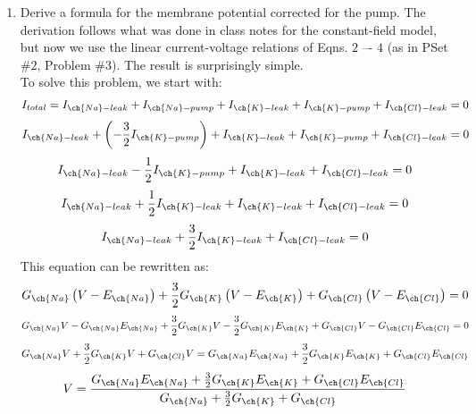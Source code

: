 \documentclass[11pt]{article}
\begin{document}
\begin{enumerate}[label=\arabic*.]
\begin{enumerate}[label=(\alph*)]
\newpage
\item
Derive a formula for the membrane potential corrected for the pump. The derivation follows what was done in class notes for the constant-field model, but now we use the linear current-voltage relations of Eqns. $2$ –- $4$ (as in PSet \#$2$, Problem \#$3$). The result is surprisingly simple.
\vspace*{1\baselineskip}
\\
To solve this problem, we start with:
\begin{align*}
I_{total} = I_{\ch{Na}-leak} + I_{\ch{Na}-pump} + I_{\ch{K}-leak} + I_{\ch{K}-pump} + I_{\ch{Cl}-leak} = 0
\end{align*}
\begin{align*}
I_{\ch{Na}-leak} + \left(-\frac{3} {2} I_{\ch{K}-pump}\right) + I_{\ch{K}-leak} + I_{\ch{K}-pump} + I_{\ch{Cl}-leak} = 0
\end{align*}
\begin{align*}
I_{\ch{Na}-leak} - \frac{1} {2} I_{\ch{K}-pump} + I_{\ch{K}-leak} + I_{\ch{Cl}-leak} = 0
\end{align*}
\begin{align*}
I_{\ch{Na}-leak} + \frac{1} {2} I_{\ch{K}-leak} + I_{\ch{K}-leak} + I_{\ch{Cl}-leak} = 0
\end{align*}
\begin{align*}
I_{\ch{Na}-leak} + \frac{3} {2} I_{\ch{K}-leak} + I_{\ch{Cl}-leak} = 0
\end{align*}
This equation can be rewritten as:
\begin{align*}
G_{\ch{Na}} \left(V - E_{\ch{Na}}\right) + \frac{3} {2} G_{\ch{K}} \left(V - E_{\ch{K}}\right) + G_{\ch{Cl}} \left(V - E_{\ch{Cl}}\right) = 0
\end{align*}
\begin{align*}
G_{\ch{Na}} V - G_{\ch{Na}} E_{\ch{Na}} + \frac{3} {2} G_{\ch{K}} V - \frac{3} {2} G_{\ch{K}} E_{\ch{K}} + G_{\ch{Cl}} V - G_{\ch{Cl}} E_{\ch{Cl}} = 0
\end{align*}
\begin{align*}
G_{\ch{Na}} V + \frac{3} {2} G_{\ch{K}} V + G_{\ch{Cl}} V = G_{\ch{Na}} E_{\ch{Na}} + \frac{3} {2} G_{\ch{K}} E_{\ch{K}} + G_{\ch{Cl}} E_{\ch{Cl}}
\end{align*}
\begin{align*}
V = \frac{G_{\ch{Na}} E_{\ch{Na}} + \frac{3} {2} G_{\ch{K}} E_{\ch{K}} + G_{\ch{Cl}} E_{\ch{Cl}}} {G_{\ch{Na}} + \frac{3} {2} G_{\ch{K}} + G_{\ch{Cl}}}
\end{align*}




\end{enumerate}
\end{enumerate}
\end{document}
